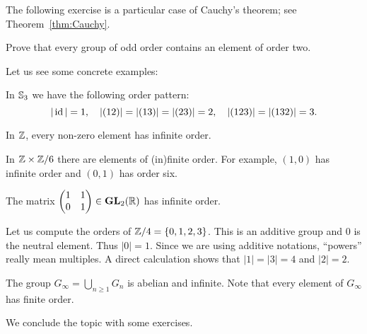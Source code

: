 The following exercise is a particular 
case of Cauchy's theorem; see Theorem~\ref{thm:Cauchy}. 

\begin{exercise}
        \label{xca:orden2}
        Prove that every group of odd order contains
        an element of order two. 
\end{exercise}
                
Let us see some concrete examples: 

\begin{example}
        In $\mathbb{S}_3$ we have the following order pattern:
        \[
        |\operatorname{id}|=1,\quad
        |(12)|=|(13)|=|(23)|=2,\quad
        |(123)|=|(132)|=3.
        \]
\end{example}
                        
\begin{example}
        In $\mathbb{Z}$, every non-zero element has 
        infinite order. 
\end{example}
                        
 \begin{example}
        In $\mathbb{Z}\times\mathbb{Z}/6$ there are elements of 
        (in)finite order. For example, $(1,0)$ 
        has infinite order and 
        $(0,1)$ has order six. 
 \end{example}
                        
\begin{example}
        The matrix $\begin{pmatrix}1&1\\0&1\end{pmatrix}\in\mathbf{GL}_2(\mathbb{R})$ has infinite order.
\end{example}                     

\begin{example}
    Let us compute the orders of $\mathbb{Z}/4=\{0,1,2,3\}$. This is an additive group and $0$ is the neutral element. 
    Thus $|0|=1$. Since we are using additive notations, ``powers'' really mean multiples. A direct calculation
    shows that $|1|=|3|=4$ and $|2|=2$. 
\end{example}
                                
\begin{example}
        The group $G_\infty=\bigcup_{n\geq1}G_n$ is abelian and infinite. Note that every element of 
        $G_\infty$ has finite order. 
\end{example}
          
We conclude the topic with some exercises. 


